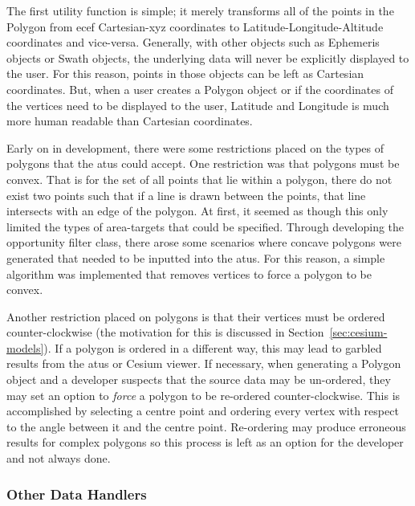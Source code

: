 The first utility function is simple; it merely transforms all of the points in
the Polygon from \acrfull{ecef} Cartesian-xyz coordinates to
Latitude-Longitude-Altitude coordinates and vice-versa.  Generally, with other
objects such as Ephemeris objects or Swath objects, the underlying data will
never be explicitly displayed to the user. For this reason, points in those
objects can be left as Cartesian coordinates. But, when a user creates a
Polygon object or if the coordinates of the vertices need to be displayed to
the user, Latitude and Longitude is much more human readable than Cartesian
coordinates. 

Early on in development, there were some restrictions placed on the types of
polygons that the \glspl{atu} could accept. One restriction was that polygons
must be convex. That is for the set of all points that lie within a polygon,
there do not exist two points such that if a line is drawn between the points,
that line intersects with an edge of the polygon. At first, it seemed as though
this only limited the types of area-targets that could be specified. Through
developing the opportunity filter class, there arose some scenarios where
concave polygons were generated that needed to be inputted into the
\glspl{atu}. For this reason, a simple algorithm was implemented that removes
vertices to force a polygon to be convex. 


Another restriction placed on polygons is that their vertices must be ordered
counter-clockwise (the motivation for this is discussed in
Section~\ref{sec:cesium-models}). If a polygon is ordered in a different way,
this may lead to garbled results from the \glspl{atu} or Cesium viewer. If
necessary, when generating a Polygon object and a developer suspects that the
source data may be un-ordered, they may set an option to \textit{force} a
polygon to be re-ordered counter-clockwise. This is accomplished by selecting a
centre point and ordering every vertex with respect to the angle between it and
the centre point. Re-ordering may produce erroneous results for complex
polygons so this process is left as an option for the developer and not always
done. 



\subsubsection{Other Data Handlers}

